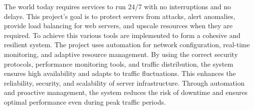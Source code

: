 The world today requires services to run 24/7 with no interruptions and no delays. This project's goal is to protect servers from attacks, alert anomalies, provide load balancing for web servers, and upscale resources when they are required. To achieve this various tools are implemented to form a cohesive and resilient system. The project uses automation for network configuration, real-time monitoring, and adaptive resource management. By using the correct security protocols, performance monitoring tools, and traffic distribution, the system ensures high availability and adapts to traffic fluctuations. This enhances the reliability, security, and scalability of server infrastructure. Through automation and proactive management, the system reduces the risk of downtime and ensures optimal performance even during peak traffic periods.